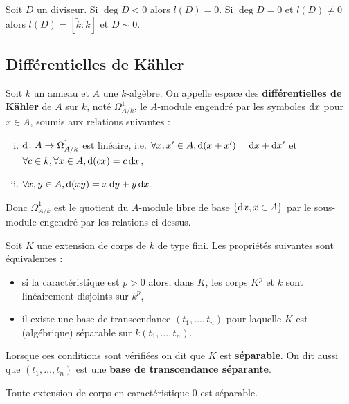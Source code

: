 	\begin{pop}
		Soit $D$ un diviseur.
		Si $\deg D < 0$ alors $l(D) = 0$.
		Si $\deg D = 0$ et $l(D) \neq 0$ alors $l(D) = [\tilde{k} : k]$ et $D \sim 0$.
	\end{pop}


\subsection{Différentielles de Kähler}

	\begin{defn}
		Soit $k$ un anneau et $A$ une $k$-algèbre.
		On appelle espace des \textbf{différentielles de Kähler} de $A$ sur $k$, noté $\Omega^1_{A/k}$, le $A$-module engendré par les symboles $\mathop{}\mathopen{}\mathrm{d} x$ pour $x \in A$, soumis aux relations suivantes :
		\begin{enumerate}[(i)]
			\item $\mathop{}\mathopen{}\mathrm{d} \colon A \to \Omega^1_{A/k}$ est linéaire, i.e. $\forall x, x' \in A, \mathop{}\mathopen{}\mathrm{d}(x + x') = \mathop{}\mathopen{}\mathrm{d} x + \mathop{}\mathopen{}\mathrm{d} x'$ et $\forall c \in k, \forall x \in A, \mathop{}\mathopen{}\mathrm{d}(cx) = c \mathop{}\mathopen{}\mathrm{d} x$,
			\item $\forall x, y \in A, \mathop{}\mathopen{}\mathrm{d}(xy) = x \mathop{}\mathopen{}\mathrm{d} y + y \mathop{}\mathopen{}\mathrm{d} x$.
		\end{enumerate}
		Donc $\Omega^1_{A/k}$ est le quotient du $A$-module libre de base $\{ \mathop{}\mathopen{}\mathrm{d} x, x \in A \}$ par le sous-module engendré par les relations ci-dessus.
	\end{defn}
	
	\begin{pop}
		Soit $K$ une extension de corps de $k$ de type fini.
		Les propriétés suivantes sont équivalentes :
		\begin{itemize}
			\item[\textbullet] si la caractéristique est $p > 0$ alors, dans $K$, les corps $K^p$ et $k$ sont linéairement disjoints sur $k^p$,
			\item[\textbullet] il existe une base de transcendance $(t_1,\ldots,t_n)$ pour laquelle $K$ est (algébrique) séparable sur $k(t_1,\ldots,t_n)$.
		\end{itemize}
		Lorsque ces conditions sont vérifiées on dit que $K$ est \textbf{séparable}.
		On dit aussi que $(t_1,\ldots,t_n)$ est une \textbf{base de transcendance séparante}.
	\end{pop}
	
	\begin{rem}
		Toute extension de corps en caractéristique $0$ est séparable.
	\end{rem}
	
